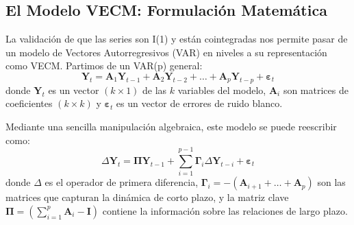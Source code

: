 \documentclass[12pt, a4paper]{article}
\begin{document}
\subsection{El Modelo VECM: Formulación Matemática}
La validación de que las series son I(1) y están cointegradas nos permite pasar de un modelo de Vectores Autorregresivos (VAR) en niveles a su representación como VECM. Partimos de un VAR(p) general:
\begin{equation}
\mathbf{Y}_t = \mathbf{A}_1 \mathbf{Y}_{t-1} + \mathbf{A}_2 \mathbf{Y}_{t-2} + \dots + \mathbf{A}_p \mathbf{Y}_{t-p} + \boldsymbol{\varepsilon}_t
\end{equation}
donde $\mathbf{Y}_t$ es un vector $(k \times 1)$ de las $k$ variables del modelo, $\mathbf{A}_i$ son matrices de coeficientes $(k \times k)$ y $\boldsymbol{\varepsilon}_t$ es un vector de errores de ruido blanco.

Mediante una sencilla manipulación algebraica, este modelo se puede reescribir como:
\begin{equation}
\Delta \mathbf{Y}_t = \boldsymbol{\Pi} \mathbf{Y}_{t-1} + \sum_{i=1}^{p-1} \boldsymbol{\Gamma}_i \Delta \mathbf{Y}_{t-i} + \boldsymbol{\varepsilon}_t
\label{eq:vecm_general}
\end{equation}
donde $\Delta$ es el operador de primera diferencia, $\boldsymbol{\Gamma}_i = -(\mathbf{A}_{i+1} + \dots + \mathbf{A}_p)$ son las matrices que capturan la dinámica de corto plazo, y la matriz clave $\boldsymbol{\Pi} = (\sum_{i=1}^{p} \mathbf{A}_i - \mathbf{I})$ contiene la información sobre las relaciones de largo plazo.
\end{document}
